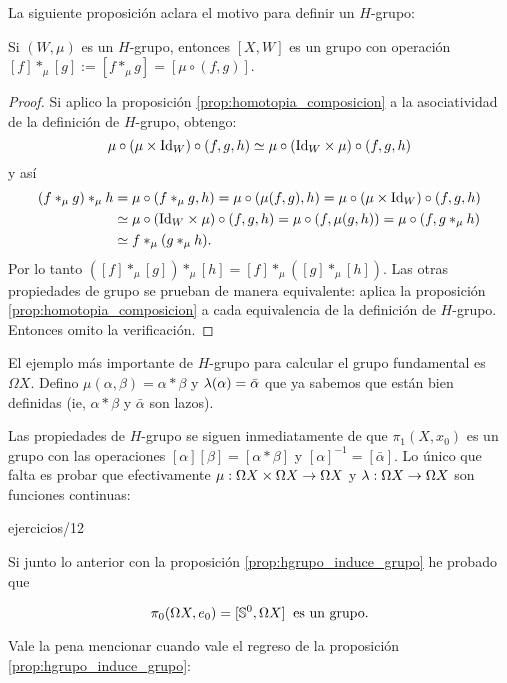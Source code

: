 \documentclass[../../topologia_algebraica]{subfiles}
\begin{document}
La siguiente proposici\'on aclara el motivo para definir un $H$-grupo:
\begin{prop}\label{prop:hgrupo_induce_grupo}
  Si $(W,\mu)$ es un $H$-grupo, entonces $[X,W]$ es un grupo con operaci\'on
  $[f]*_{\mu}[g]:=[f*_{\mu}g]=[\mu\circ(f,g)]$.
\end{prop}
\begin{proof}
  Si aplico la proposici\'on \ref{prop:homotopia_composicion} a la asociatividad de la definici\'on
  de $H$-grupo, obtengo:
  \[
    \mu\circ(\mu\times\text{Id}_W)\circ(f,g,h)\simeq\mu\circ(\text{Id}_W\times\mu)\circ(f,g,h)
  \]
  y as\'i
  \begin{align*}
  (f*_{\mu}g)*_{\mu}h & =
  \mu\circ(f*_{\mu}g,h)=
  \mu\circ(\mu(f,g),h)=
  \mu\circ(\mu\times\text{Id}_W)\circ(f,g,h) \\ & \simeq
  \mu\circ(\text{Id}_W\times\mu)\circ(f,g,h)=
  \mu\circ(f,\mu(g,h))=
  \mu\circ(f,g*_{\mu}h) \\ & \simeq
  f*_{\mu}(g*_{\mu}h).
\end{align*}
Por lo tanto $([f]*_{\mu}[g])*_{\mu}[h]=[f]*_{\mu}([g]*_{\mu}[h])$. Las otras propiedades
de grupo se prueban de manera equivalente: aplica la proposici\'on \ref{prop:homotopia_composicion}
a cada equivalencia de la definici\'on de $H$-grupo. Entonces omito la verificaci\'on.
\end{proof}

El ejemplo m\'as importante de $H$-grupo para calcular el grupo fundamental es $\Omega X$.
Defino $\mu(\alpha,\beta)=\alpha*\beta$ y $\lambda(\alpha)=\bar{\alpha}$ que ya sabemos que
est\'an bien definidas (ie, $\alpha*\beta$ y $\bar{\alpha}$ son lazos).

Las propiedades de $H$-grupo se siguen inmediatamente de que $\pi_1(X,x_0)$ es un grupo
con las operaciones $[\alpha][\beta]=[\alpha*\beta]$ y $[\alpha]^{-1}=[\bar{\alpha}]$. Lo
\'unico que falta es probar que efectivamente $\mu:\Omega X\times\Omega X\rightarrow\Omega X$ y
$\lambda:\Omega X\rightarrow\Omega X$ son funciones continuas:

{ejercicios/12} %

Si junto lo anterior con la proposici\'on \ref{prop:hgrupo_induce_grupo} he probado que

\begin{cor}\label{cor:pi0_es_grupo}
  \[
    \pi_0(\Omega X,e_0)=[\mathbb{S}^0,\Omega X] \;\;\text{es un grupo}.
  \]
\end{cor}

Vale la pena mencionar cuando vale el regreso de la proposici\'on \ref{prop:hgrupo_induce_grupo}:
\end{document}
